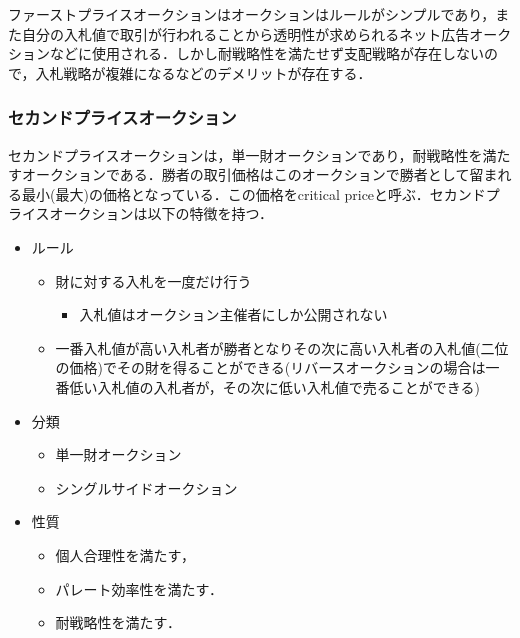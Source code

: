ファーストプライスオークションはオークションはルールがシンプルであり，また自分の入札値で取引が行われることから透明性が求められるネット広告オークションなどに使用される\cite{google}．しかし耐戦略性を満たせず支配戦略が存在しないので，入札戦略が複雑になるなどのデメリットが存在する．

\hypertarget{ux30bbux30abux30f3ux30c9ux30d7ux30e9ux30a4ux30b9ux30aaux30fcux30afux30b7ux30e7ux30f3}{%
\subsubsection{セカンドプライスオークション}\label{ux30bbux30abux30f3ux30c9ux30d7ux30e9ux30a4ux30b9ux30aaux30fcux30afux30b7ux30e7ux30f3}}

セカンドプライスオークションは，単一財オークションであり，耐戦略性を満たすオークションである．勝者の取引価格はこのオークションで勝者として留まれる最小(最大)の価格となっている．この価格をcritical
priceと呼ぶ．セカンドプライスオークションは以下の特徴を持つ．

\begin{itemize}
\tightlist
\item
  ルール

  \begin{itemize}
  \tightlist
  \item
    財に対する入札を一度だけ行う

    \begin{itemize}
    \tightlist
    \item
      入札値はオークション主催者にしか公開されない
    \end{itemize}
  \item
    一番入札値が高い入札者が勝者となりその次に高い入札者の入札値(二位の価格)でその財を得ることができる(リバースオークションの場合は一番低い入札値の入札者が，その次に低い入札値で売ることができる)
  \end{itemize}
\item
  分類

  \begin{itemize}
  \tightlist
  \item
    単一財オークション
  \item
    シングルサイドオークション
  \end{itemize}
\item
  性質

  \begin{itemize}
  \tightlist
  \item
    個人合理性を満たす，
  \item
    パレート効率性を満たす．
  \item
    耐戦略性を満たす．
  \end{itemize}
\end{itemize}

